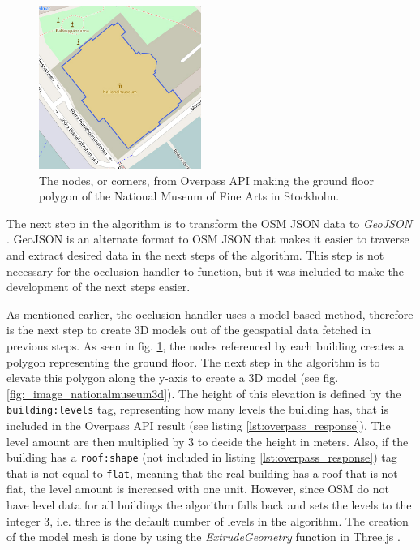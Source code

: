 \begin{figure}
\includegraphics[height=200px, width=200px]{_image_nationalmuseum2d}
\caption{The nodes, or corners, from Overpass API making the ground floor polygon of the National Museum of Fine Arts in Stockholm.}
\label{fig:_image_nationalmuseum2d}
\end{figure}

The next step in the algorithm is to transform the OSM JSON data to \textit{GeoJSON} \cite{geojson}. GeoJSON is an alternate format to OSM JSON that makes it easier to traverse and extract desired data in the next steps of the algorithm. This step is not necessary for the occlusion handler to function, but it was included to make the development of the next steps easier.

As mentioned earlier, the occlusion handler uses a model-based method, therefore is the next step to create 3D models out of the geospatial data fetched in previous steps. As seen in fig. \ref{fig:_image_nationalmuseum2d}, the nodes referenced by each building creates a polygon representing the ground floor. The next step in the algorithm is to elevate this polygon along the y-axis to create a 3D model (see fig.  \ref{fig:_image_nationalmuseum3d}). The height of this elevation is defined by the \texttt{building:levels} tag, representing how many levels the building has, that is included in the Overpass API result (see listing \ref{lst:overpass_response}). The level amount are then multiplied by 3 to decide the height in meters. Also, if the building has a \texttt{roof:shape} (not included in listing \ref{lst:overpass_response}) tag that is not equal to \texttt{flat}, meaning that the real building has a roof that is not flat, the level amount is increased with one unit. However, since OSM do not have level data for all buildings the algorithm falls back and sets the levels to the integer 3, i.e. three is the default number of levels in the algorithm. The creation of the model mesh is done by using the \textit{ExtrudeGeometry} function in Three.js \cite{threejsExtrudegeometry}. 

